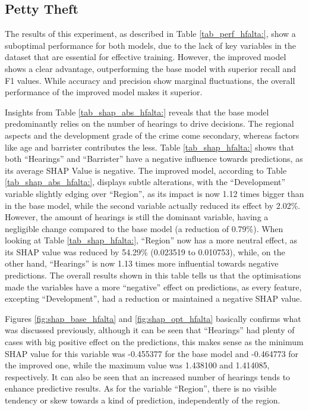 \documentclass[twoside,11pt]{article}
\begin{document}

\subsection{Petty Theft}

The results of this experiment, as described in Table \ref{tab_perf_hfalta:}, show a suboptimal performance for both models, due to the lack of key variables in the dataset that are essential for effective training. However, the improved model shows a clear advantage, outperforming the base model with superior recall and F1 values. While accuracy and precision show marginal fluctuations, the overall performance of the improved model makes it superior.

Insights from Table \ref{tab_shap_abs_hfalta:} reveals that the base model predominantly relies on the number of hearings to drive decisions. The regional aspects and the development grade of the crime come secondary, whereas factors like age and barrister contributes the less. Table \ref{tab_shap_hfalta:} shows that both ``Hearings'' and ``Barrister'' have a negative influence towards predictions, as its average SHAP Value is negative. The improved model, according to Table \ref{tab_shap_abs_hfalta:}, displays subtle alterations, with the ``Development'' variable slightly edging over ``Region'', as its impact is now 1.12 times bigger than in the base model, while the second variable actually reduced its effect by 2.02\%. However, the amount of hearings is still the dominant variable, having a negligible change compared to the base model (a reduction of 0.79\%). When looking at Table \ref{tab_shap_hfalta:}, ``Region'' now has a more neutral effect, as its SHAP value was reduced by 54.29\% (0.023519 to 0.010753), while, on the other hand, ``Hearings'' is now 1.13 times more influential towards negative predictions. The overall results shown in this table tells us that the optimisations made the variables have a more ``negative'' effect on predictions, as every feature, excepting ``Development'', had a reduction or maintained a negative SHAP value.

Figures \ref{fig:shap_base_hfalta} and \ref{fig:shap_opt_hfalta} basically confirms what was discussed previously, although it can be seen that ``Hearings'' had plenty of cases with big positive effect on the predictions, this makes sense as the minimum SHAP value for this variable was -0.455377 for the base model and -0.464773 for the improved one, while the maximum value was 1.438100 and 1.414085, respectively. It can also be seen that an increased number of hearings tends to enhance predictive results. As for the variable ``Region'', there is no visible tendency or skew towards a kind of prediction, independently of the region.
\end{document}
